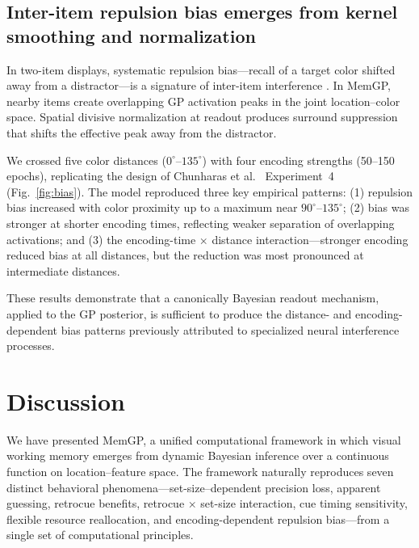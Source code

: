 \documentclass[11pt,letterpaper]{article}
\begin{document}
\subsection{Inter-item repulsion bias emerges from kernel smoothing and normalization}

In two-item displays, systematic repulsion bias---recall of a target color shifted away from a distractor---is a signature of inter-item interference \cite{chunharasAdaptivePerspectiveVisual2022a, baysPrecisionVisualWorking2009b}. In MemGP, nearby items create overlapping GP activation peaks in the joint location--color space. Spatial divisive normalization at readout \cite{carandiniNormalizationCanonicalNeural2012} produces surround suppression that shifts the effective peak away from the distractor.

We crossed five color distances ($0^\circ$--$135^\circ$) with four encoding strengths (50--150 epochs), replicating the design of Chunharas et al.\ \cite{chunharasAdaptivePerspectiveVisual2022a} Experiment~4 (Fig.~\ref{fig:bias}). The model reproduced three key empirical patterns: (1) repulsion bias increased with color proximity up to a maximum near $90^\circ$--$135^\circ$; (2) bias was stronger at shorter encoding times, reflecting weaker separation of overlapping activations; and (3) the encoding-time $\times$ distance interaction---stronger encoding reduced bias at all distances, but the reduction was most pronounced at intermediate distances.

These results demonstrate that a canonically Bayesian readout mechanism, applied to the GP posterior, is sufficient to produce the distance- and encoding-dependent bias patterns previously attributed to specialized neural interference processes.


\section{Discussion}

We have presented MemGP, a unified computational framework in which visual working memory emerges from dynamic Bayesian inference over a continuous function on location--feature space. The framework naturally reproduces seven distinct behavioral phenomena---set-size--dependent precision loss, apparent guessing, retrocue benefits, retrocue $\times$ set-size interaction, cue timing sensitivity, flexible resource reallocation, and encoding-dependent repulsion bias---from a single set of computational principles.
\end{document}
